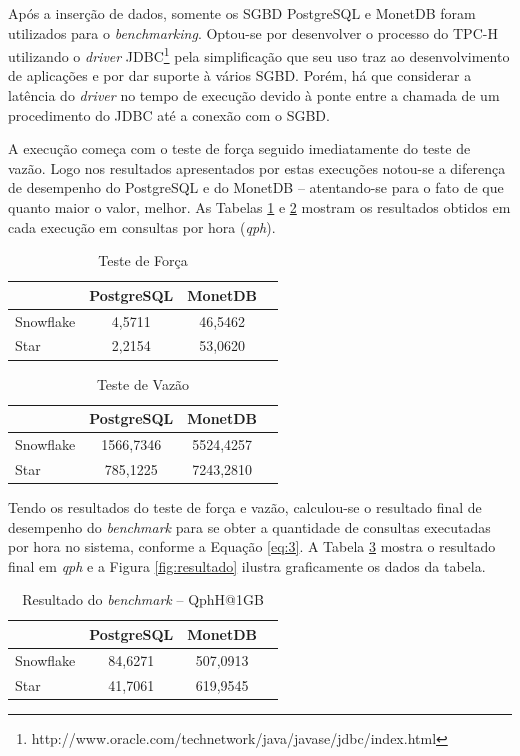 \documentclass[conference]{IEEEtran}
\begin{document}
Após a inserção de dados, somente os SGBD PostgreSQL e MonetDB foram utilizados para o \textit{benchmarking}. Optou-se por desenvolver o processo do TPC-H utilizando o \textit{driver} JDBC\footnote{http://www.oracle.com/technetwork/java/javase/jdbc/index.html} pela simplificação que seu uso traz ao desenvolvimento de aplicações e por dar suporte à vários SGBD. Porém, há que considerar a latência do \textit{driver} no tempo de execução devido à ponte entre a chamada de um procedimento do JDBC até a conexão com o SGBD. 

A execução começa com o teste de força seguido imediatamente do teste de vazão. Logo nos resultados apresentados por estas execuções notou-se a diferença de desempenho do PostgreSQL e do MonetDB -- atentando-se para o fato de que quanto maior o valor, melhor. As Tabelas \ref{tab:forca} e \ref{tab:vazao} mostram os resultados obtidos em cada execução em consultas por hora (\textit{qph}).

\begin{table}[htpb]
\centering
\caption{Teste de Força}
\label{tab:forca}
\begin{tabular}{@{}lccc@{}}
\toprule
          & PostgreSQL & MonetDB \\ \midrule
Snowflake & 4,5711     & 46,5462   \\
Star      & 2,2154        & 53,0620     \\ \bottomrule
\end{tabular}
\end{table}

\begin{table}[htpb]
\centering
\caption{Teste de Vazão}
\label{tab:vazao}
\begin{tabular}{@{}lccc@{}}
\toprule
          & PostgreSQL & MonetDB \\ \midrule
Snowflake & 1566,7346     & 5524,4257   \\
Star      & 785,1225        & 7243,2810    \\ \bottomrule
\end{tabular}
\end{table}

Tendo os resultados do teste de força e vazão, calculou-se o resultado final de desempenho do \textit{benchmark} para se obter a quantidade de consultas executadas por hora no sistema, conforme a Equação \ref{eq:3}. A Tabela \ref{tab:resultado} mostra o resultado final em \textit{qph} e a Figura \ref{fig:resultado} ilustra graficamente os dados da tabela.

\begin{table}[htpb]
\centering
\caption{Resultado do \textit{benchmark} -- QphH@1GB}
\label{tab:resultado}
\begin{tabular}{@{}lccc@{}}
\toprule
          & PostgreSQL & MonetDB \\ \midrule
Snowflake & 84,6271     & 507,0913   \\
Star      & 41,7061        & 619,9545    \\ \bottomrule
\end{tabular}
\end{table}
\end{document}
